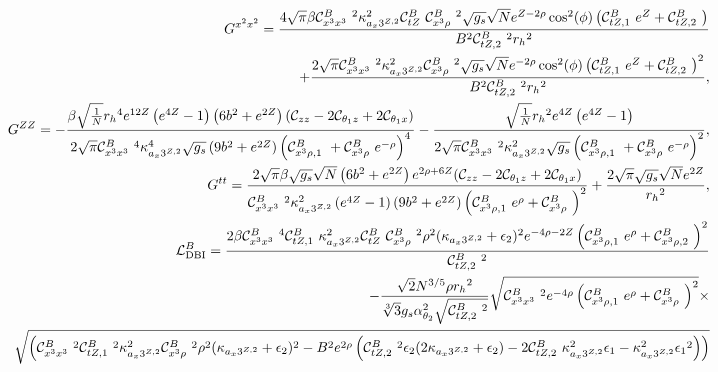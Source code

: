 {\scriptsize
\begin{eqnarray}
\label{iG22+iGZZ+SDBI}
& & G^{x^2x^2} = \frac{4 \sqrt{\pi } \beta  {\cal C}_{x^3x^3}^B\ ^2 \kappa_{a_x3^{Z,2}}^2 {\cal C}_{tZ}^B\  {\cal C}_{x^3\rho}^B\ ^2 \sqrt{{g_s}} \sqrt{N} e^{Z-2
   \rho } \cos ^2(\phi ) \left({\cal C}_{tZ,1}^B\  e^Z+{\cal C}_{tZ,2}^B\ \right)}{B^2 {\cal C}_{tZ,2}^B\ ^2 {r_h}^2}\nonumber\\
& &  \quad\quad\quad+\frac{2 \sqrt{\pi }
   {\cal C}_{x^3x^3}^B\ ^2 \kappa_{a_x3^{Z,2}}^2 {\cal C}_{x^3\rho}^B\ ^2 \sqrt{{g_s}} \sqrt{N} e^{-2 \rho } \cos ^2(\phi )
   \left({\cal C}_{tZ,1}^B\  e^Z+{\cal C}_{tZ,2}^B\ \right)^2}{B^2 {\cal C}_{tZ,2}^B\ ^2 {r_h}^2},\nonumber\\
& & G^{ZZ} = -\frac{\beta  \sqrt{\frac{1}{N}} {r_h}^4 e^{12 Z} \left(e^{4 Z}-1\right) \left(6 b^2+e^{2 Z}\right) ({\cal C}_{zz}-2 {\cal C}_{\theta_1z}+2
  {\cal C}_{\theta_1x})}{2 \sqrt{\pi } {\cal C}_{x^3x^3}^B\ ^4 \kappa_{a_x3^{Z,2}}^4 \sqrt{{g_s}} \left(9 b^2+e^{2 Z}\right) \left({\cal C}_{x^3\rho, 1}^B\ +{\cal C}_{x^3\rho}^B\  e^{-\rho }\right)^4}-\frac{\sqrt{\frac{1}{N}} {r_h}^2 e^{4 Z} \left(e^{4 Z}-1\right)}{2 \sqrt{\pi }
   {\cal C}_{x^3x^3}^B\ ^2 \kappa_{a_x3^{Z,2}}^2 \sqrt{{g_s}} \left({\cal C}_{x^3\rho,1}^B\ +{\cal C}_{x^3\rho}^B\  e^{-\rho }\right)^2},\nonumber\\
& & G^{tt}=\frac{2 \sqrt{\pi } \beta  \sqrt{{g_s}} \sqrt{N} \left(6 b^2+e^{2 Z}\right) e^{2 \rho +6 Z} ({\cal C}_{zz}-2 {\cal C}_{\theta_1z}+2{\cal C}_{\theta_1x})}{{\cal C}_{x^3x^3}^B\ ^2
   \kappa_{a_x3^{Z,2}}^2 \left(e^{4 Z}-1\right) \left(9 b^2+e^{2 Z}\right) \left({\cal C}_{x^3\rho,1}^B\  e^{\rho }+{\cal C}_{x^3\rho}^B\ \right)^2}+\frac{2 \sqrt{\pi } \sqrt{{g_s}} \sqrt{N} e^{2
   Z}}{{r_h}^2},\nonumber\\
& & {\cal L}_{\rm DBI}^B = \frac{2 \beta  {\cal C}_{x^3x^3}^B\ ^4 {\cal C}_{tZ,1}^B\  \kappa_{a_x3^{Z,2}}^2 {\cal C}_{tZ}^B\ 
   {\cal C}_{x^3\rho}^B\ ^2 \rho ^2 (\kappa_{a_x3^{Z,2}}+{\epsilon_2})^2 e^{-4 \rho -2 Z}
   \left({\cal C}_{x^3\rho,1}^B\  e^{\rho }+{\cal C}_{x^3\rho,2}^B\ \right)^2}{{\cal C}_{tZ,2}^B\ ^2}\nonumber\\
& & \quad\quad  -\frac{\sqrt{2} N^{3/5} \rho  {r_h}^2}{\sqrt[3]{3} {g_s} \alpha
   _{\theta _2}^2 \sqrt{{\cal C}_{tZ,2}^B\ ^2} }
   \sqrt{{\cal C}_{x^3x^3}^B\ ^2 e^{-4 \rho } \left({\cal C}_{x^3\rho,1}^B\  e^{\rho
}+{\cal C}_{x^3\rho}^B\ \right)^2} \times \nonumber \\ & & \sqrt{   \left({\cal C}_{x^3x^3}^B\ ^2 {\cal C}_{tZ,1}^B\ ^2
   \kappa_{a_x3^{Z,2}}^2 {\cal C}_{x^3\rho}^B\ ^2 \rho ^2
   (\kappa_{a_x3^{Z,2}}+{\epsilon_2})^2-B^2 e^{2 \rho } \left({\cal C}_{tZ,2}^B\ ^2
   {\epsilon_2} (2 \kappa_{a_x3^{Z,2}}+{\epsilon_2})-2 {\cal C}_{tZ,2}^B\ 
   \kappa_{a_x3^{Z,2}}^2 {\epsilon_1}-\kappa_{a_x3^{Z,2}}^2
{\epsilon_1}^2\right)\right)} 
\end{eqnarray}
}

